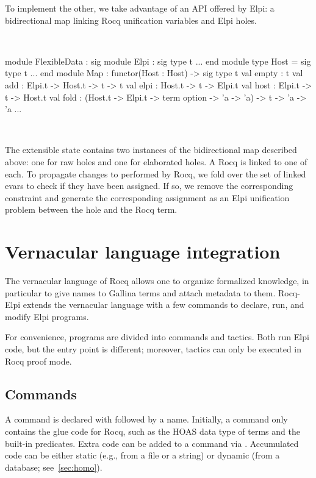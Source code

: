 \documentclass[a4paper, 11pt]{book}
\newenvironment{ocamlcode}
  {\VerbatimEnvironment~\\\begin{ocamlbox}\begin{xocamlcode}}{\end{xocamlcode}
\end{ocamlbox}\\}
\begin{document}
To implement the other, we take advantage of an API offered by Elpi: a
bidirectional map linking Rocq unification variables and Elpi holes.

\begin{ocamlcode}
module FlexibleData : sig
  module Elpi : sig type t ... end
  module type Host = sig type t ... end
  module Map : functor(Host : Host) -> sig
    type t
    val empty : t
    val add : Elpi.t -> Host.t -> t -> t
    val elpi   : Host.t -> t -> Elpi.t
    val host : Elpi.t -> t -> Host.t
    val fold :
      (Host.t -> Elpi.t -> term option -> 'a -> 'a) -> t -> 'a -> 'a
    ...
\end{ocamlcode}

\noindent
The extensible state contains two instances of the bidirectional map
described above: one for raw holes and one for elaborated holes. A Rocq
 is linked to one of each.
To propagate changes to  performed by Rocq, we fold
over the set of linked evars to check if they have been assigned. If so, we
remove the corresponding  constraint and generate the corresponding
assignment as an Elpi unification problem between the hole and the Rocq term.



\section{Vernacular language integration}


The vernacular language of Rocq allows one to organize formalized knowledge,
in particular to give names to Gallina terms and attach metadata to them.
Rocq-Elpi extends the vernacular language with a few commands to declare, run,
and modify Elpi programs.

For convenience, programs are divided into commands and tactics. Both run Elpi
code, but the entry point is different; moreover, tactics can only be executed
in Rocq proof mode.

\subsection{Commands}

A command is declared with  followed by a name. Initially,
a command only contains the glue code for Rocq, such as the HOAS data type of
terms and the built-in predicates. Extra code can be added to a command via
. Accumulated code can be either static (e.g., from a
file or a string) or dynamic (from a database; see~\cref{sec:homo}).
\end{document}
